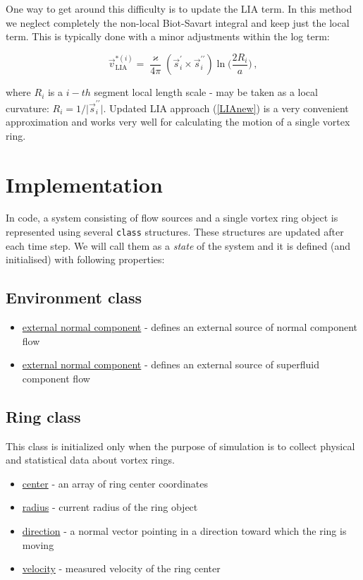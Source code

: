 One way to get around this difficulty is to update the LIA term. In this method we neglect completely the non-local Biot-Savart integral and keep just the local term. This is typically done with a minor adjustments within the log term:

\begin{equation}
\vec{v}_{\text{LIA}}^{*(i)} =
\frac{\varkappa}{4\pi} (\vec{s}^{\prime}_i \times \vec{s}^{\prime \prime}_i)
\ln{\Bigg(\frac{2 R_i}{a}\Bigg)}\,,
\label{LIAnew}
\end{equation}

where $R_i$ is a $i-th$ segment local length scale - may be taken \cite{schwarz_filament} as a local curvature: $R_i = 1 / \vert \vec{s}^{\prime \prime}_i \vert$. Updated LIA approach (\ref{LIAnew}) is a very convenient approximation and works very well for calculating the motion of a single vortex ring.

\section{Implementation}

In code, a system consisting of flow sources and a single vortex ring object is represented using several \texttt{class} structures. These structures are updated after each time step. We will call them as a \textit{state} of the system and it is defined (and initialised) with following properties:

\subsection*{Environment class}

\begin{itemize}
	\item \underline{external normal component} - defines an external source of normal component flow
	\item \underline{external normal component} - defines an external source of superfluid component flow
\end{itemize}

\subsection*{Ring class}

This class is initialized only when the purpose of simulation is to collect physical and statistical data about vortex rings.

\begin{itemize}
	\item \underline{center} - an array of ring center coordinates
	\item \underline{radius} - current radius of the ring object
	\item \underline{direction} - a normal vector pointing in a direction toward which the ring is moving
	\item \underline{velocity} - measured velocity of the ring center
\end{itemize}


